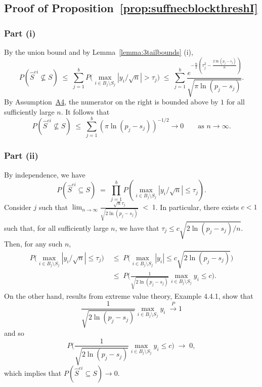 \documentclass[
  12pt]{article}
\begin{document}
\subsection{Proof of Proposition~\ref{prop:suffnecblockthreshI}} 

\subsubsection{Part (i)} 
By the union bound and by Lemma~\ref{lemma:3tailbounds} (i),
\begin{equation}\label{eq:type1convrate}
P\left(\hat{S}^{ei} \not\subseteq S\right)\;\leq\; \sum_{j=1}^b P\Big(\max_{i\in B_j\setminus S_j}|y_i/\sqrt{n}|>\tau_{j}\Big)\;\leq\;\sum_{j=1}^b\frac{e^{-\tfrac{n}{2}\left(\tau_j^2-\tfrac{2\ln(p_j-s_j)}{n}\right)}}{\sqrt{\pi\ln(p_j-s_j)}} 	.
 \end{equation}
 By Assumption~\hyperlink{lab:A4}{A4}, the numerator on the right is bounded above by $1$ for all sufficiently large $n$. It follows that 
	$$P\left(\hat{S}^{ei} \not\subseteq S\right) \;\leq\; \sum_{j=1}^b (\pi\ln (p_j-s_j))^{-1/2} \to 0\qquad \mbox{as } n\to \infty.$$
\subsubsection{Part (ii)}  By independence, we have 
$$P(\hat{S}^{ei} \subseteq S)\;=\;\prod_{j=1}^b P(\max_{i \in B_j\setminus S_j}|y_i/\sqrt{n}| \leq \tau_j).$$ 
Consider $j$ such that $\lim_{n\to \infty} \frac{\sqrt{n}\tau_j}{\sqrt{2\ln(p_j-s_j)}} \;<\;1$. In particular, there exists $c<1$ such that, for all sufficiently large $n$, we have that $\tau_j\leq c\sqrt{2\ln(p_j-s_j)/n}$. Then, for any such $n$,
\begin{align*}
    P\Big(\max_{i \in B_j\setminus S_j}|y_i/\sqrt{n}| \leq \tau_j\Big)&\;\leq\; P\Big(\max_{i \in B_j\setminus S_j}|y_i| \leq c \sqrt{2\ln(p_j-s_j)}\Big)\\&\;\leq\;P\Big(\tfrac{1}{\sqrt{2\ln(p_j-s_j)}}\max_{i \in B_j\setminus S_j}y_i \leq c \Big).
\end{align*}
On the other hand, results from extreme value theory, \cite{galambos} Example 4.4.1, show that 
 $$\frac{1}{\sqrt{2 \ln(p_j-s_j)}}\max_{i\in B_j\setminus S_j}y_i \;\overset{P}{\longrightarrow} 1$$
 and so 
 $$
 P\Big(\frac{1}{\sqrt{2\ln(p_j-s_j)}}\max_{i \in B_j\setminus S_j}y_i \leq c \Big)\;\to\;0,
 $$ 
 which implies that $P(\hat{S}^{ei} \subseteq S)\to 0$. 
\end{document}
